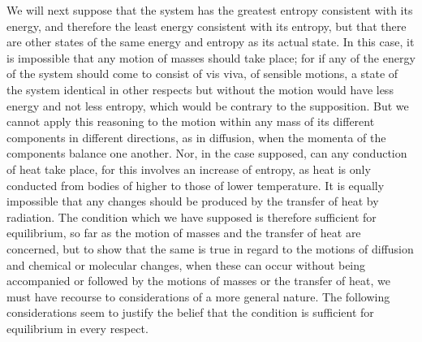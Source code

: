 \documentclass[11pt]{article}
\begin{document}
We will next suppose that the system has the greatest entropy consistent with its energy, and therefore the least energy consistent with its entropy, but that there are other states of the same energy and entropy as its actual state. In this case, it is impossible that any motion of masses should take place; for if any of the energy of the system should come to consist of vis viva, of sensible motions, a state of the system identical in other respects but without the motion would have less energy and not less entropy, which would be contrary to the supposition. But we cannot apply this reasoning to the motion within any mass of its different components in different directions, as in diffusion, when the momenta of the components balance one another. Nor, in the case supposed, can any conduction of heat take place, for this involves an increase of entropy, as heat is only conducted from bodies of higher to those of lower temperature. It is equally impossible that any changes should be produced by the transfer of heat by radiation. The condition which we have supposed is therefore sufficient for equilibrium, so far as the motion of masses and the transfer of heat are concerned, but to show that the same is true in regard to the motions of diffusion and chemical or molecular changes, when these can occur without being accompanied or followed by the motions of masses or the transfer of heat, we must have recourse to considerations of a more general nature. The following considerations seem to justify the belief that the condition is sufficient for equilibrium in every respect.
\end{document}
